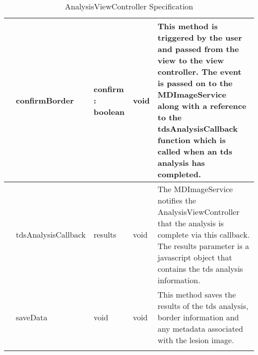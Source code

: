 {\begin{longtable}[H]{  | >{\bfseries}p{2cm} | p{2.2cm} | p{1.5cm} | p{1.5cm} | p{4cm} | }
        & confirmBorder & confirm : boolean & void
        & This method is triggered by the user and passed from the view to the view controller. The event is passed on to the MDImageService along with a reference to the tdsAnalysisCallback function which is called when an tds analysis has completed.
        \\ \hline
        & tdsAnalysisCallback & results & void
        & The MDImageService notifies the AnalysisViewController that the analysis is complete via this callback. The results parameter is a javascript object that contains the tds analysis information.
        \\ \hline
        & saveData & void & void
        & This method saves the results of the tds analysis, border information and any metadata associated with the lesion image.
        \\ \hline


    \caption{AnalysisViewController Specification}
    \label{fig:analysis_controller}
\end{longtable}
}